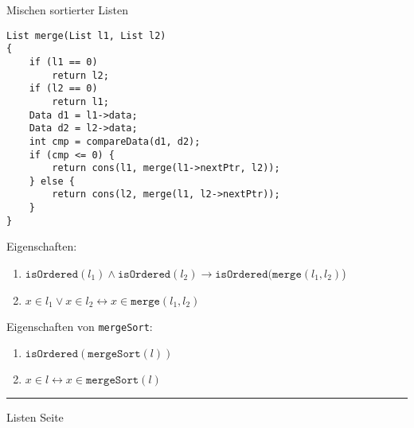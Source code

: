 \begin{slide}{}
\normalsize

\begin{center}
Mischen sortierter Listen
\end{center}
\vspace*{0.5cm}

\footnotesize
\begin{verbatim}
List merge(List l1, List l2)
{
    if (l1 == 0) 
        return l2;
    if (l2 == 0) 
        return l1;
    Data d1 = l1->data;
    Data d2 = l2->data;
    int cmp = compareData(d1, d2);
    if (cmp <= 0) {
        return cons(l1, merge(l1->nextPtr, l2));
    } else {
        return cons(l2, merge(l1, l2->nextPtr));
    }
}
\end{verbatim}
Eigenschaften:
\begin{enumerate}
\item $\mathtt{isOrdered}(l_1) \wedge \mathtt{isOrdered}(l_2) \rightarrow \mathtt{isOrdered}(\mathtt{merge}(l_1, l_2)$)
\item $x \in l_1 \vee x \in l_2 \leftrightarrow x \in \mathtt{merge}(l_1, l_2)$
\end{enumerate}

Eigenschaften von \texttt{mergeSort}:
\begin{enumerate}
\item $\mathtt{isOrdered}(\mathtt{mergeSort}(l))$
\item $x\in l \leftrightarrow x \in \mathtt{mergeSort}(l)$
\end{enumerate}

\vspace*{\fill}
\tiny \addtocounter{mypage}{1}
\rule{17cm}{1mm}
Listen  \hspace*{\fill} Seite 
\end{slide}


